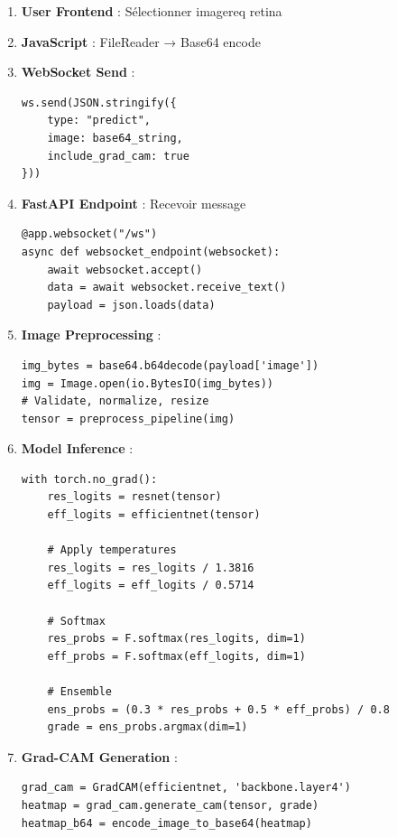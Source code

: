 \documentclass[12pt,a4paper,oneside]{report}
\begin{document}
\begin{enumerate}
    \item \textbf{User Frontend} : Sélectionner imagereq retina
    \item \textbf{JavaScript} : FileReader → Base64 encode
    \item \textbf{WebSocket Send} : 
    \begin{lstlisting}
ws.send(JSON.stringify({
    type: "predict",
    image: base64_string,
    include_grad_cam: true
}))
    \end{lstlisting}
    
    \item \textbf{FastAPI Endpoint} : Recevoir message
    \begin{lstlisting}
@app.websocket("/ws")
async def websocket_endpoint(websocket):
    await websocket.accept()
    data = await websocket.receive_text()
    payload = json.loads(data)
    \end{lstlisting}
    
    \item \textbf{Image Preprocessing} :
    \begin{lstlisting}
img_bytes = base64.b64decode(payload['image'])
img = Image.open(io.BytesIO(img_bytes))
# Validate, normalize, resize
tensor = preprocess_pipeline(img)
    \end{lstlisting}
    
    \item \textbf{Model Inference} :
    \begin{lstlisting}
with torch.no_grad():
    res_logits = resnet(tensor)
    eff_logits = efficientnet(tensor)
    
    # Apply temperatures
    res_logits = res_logits / 1.3816
    eff_logits = eff_logits / 0.5714
    
    # Softmax
    res_probs = F.softmax(res_logits, dim=1)
    eff_probs = F.softmax(eff_logits, dim=1)
    
    # Ensemble
    ens_probs = (0.3 * res_probs + 0.5 * eff_probs) / 0.8
    grade = ens_probs.argmax(dim=1)
    \end{lstlisting}
    
    \item \textbf{Grad-CAM Generation} :
    \begin{lstlisting}
grad_cam = GradCAM(efficientnet, 'backbone.layer4')
heatmap = grad_cam.generate_cam(tensor, grade)
heatmap_b64 = encode_image_to_base64(heatmap)
    \end{lstlisting}
    

\end{enumerate}
\end{document}
